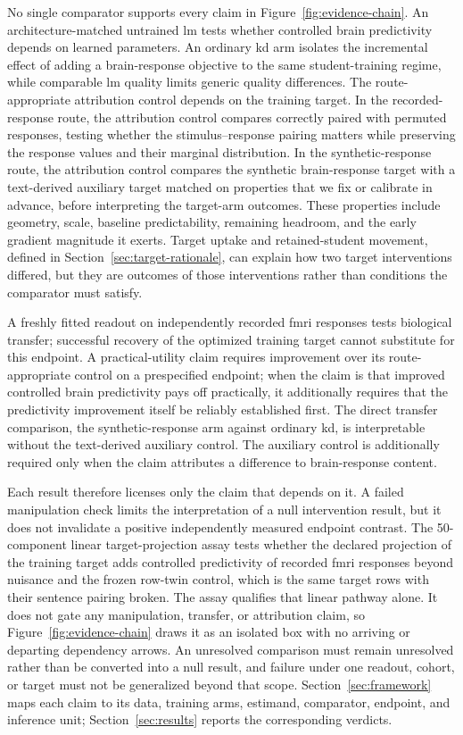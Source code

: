 No single comparator supports every claim in Figure~\ref{fig:evidence-chain}.
An architecture-matched untrained \ac{lm} tests whether controlled brain predictivity depends on learned parameters.
An ordinary \ac{kd} arm isolates the incremental effect of adding a brain-response objective to the same student-training regime, while comparable \ac{lm} quality limits generic quality differences.
The route-appropriate attribution control depends on the training target.
In the recorded-response route, the attribution control compares correctly paired with permuted responses, testing whether the stimulus--response pairing matters while preserving the response values and their marginal distribution.
In the synthetic-response route, the attribution control compares the synthetic brain-response target with a text-derived auxiliary target matched on properties that we fix or calibrate in advance, before interpreting the target-arm outcomes.
These properties include geometry, scale, baseline predictability, remaining headroom, and the early gradient magnitude it exerts.
Target uptake and retained-student movement, defined in Section~\ref{sec:target-rationale}, can explain how two target interventions differed, but they are outcomes of those interventions rather than conditions the comparator must satisfy.

A freshly fitted readout on independently recorded \ac{fmri} responses tests biological transfer; successful recovery of the optimized training target cannot substitute for this endpoint.
A practical-utility claim requires improvement over its route-appropriate control on a prespecified endpoint; when the claim is that improved controlled brain predictivity pays off practically, it additionally requires that the predictivity improvement itself be reliably established first.
The direct transfer comparison, the synthetic-response arm against ordinary \ac{kd}, is interpretable without the text-derived auxiliary control.
The auxiliary control is additionally required only when the claim attributes a difference to brain-response content.

Each result therefore licenses only the claim that depends on it.
A failed manipulation check limits the interpretation of a null intervention result, but it does not invalidate a positive independently measured endpoint contrast.
The 50-component linear target-projection assay tests whether the declared projection of the training target adds controlled predictivity of recorded \ac{fmri} responses beyond nuisance and the frozen row-twin control, which is the same target rows with their sentence pairing broken.
The assay qualifies that linear pathway alone.
It does not gate any manipulation, transfer, or attribution claim, so Figure~\ref{fig:evidence-chain} draws it as an isolated box with no arriving or departing dependency arrows.
An unresolved comparison must remain unresolved rather than be converted into a null result, and failure under one readout, cohort, or target must not be generalized beyond that scope.
Section~\ref{sec:framework} maps each claim to its data, training arms, estimand, comparator, endpoint, and inference unit; Section~\ref{sec:results} reports the corresponding verdicts.
